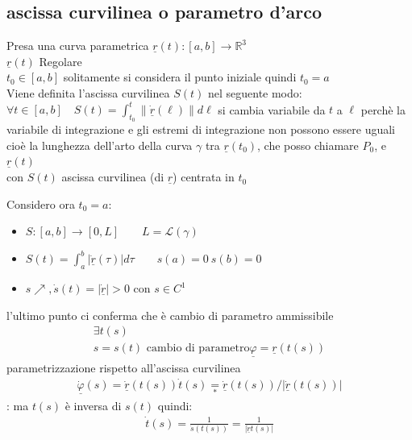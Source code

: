 \documentclass[a4paper, oneside]{article}
\begin{document}
\subsection{ascissa curvilinea o parametro d'arco}
\begin{definition}
    Presa una curva parametrica $\underline{r}(t):[a,b] \to \mathbb{R}^3$\\
     $\underline{r}(t)$ Regolare\\
     $t_0 \in [a,b]$ \tiny solitamente si considera il punto iniziale quindi $t_0 = a$\normalsize \\
    Viene definita l'ascissa curvilinea $S(t)$ nel seguente modo:\\ $\forall t \in [a,b] \quad S(t) = \int_{t_0}^{t}  \left\lVert \underline{\dot{r}}(\ell)\right\rVert  d\ell$ \tiny si cambia variabile da $t$ a $\ell$ perchè la variabile di integrazione e gli estremi di integrazione non possono essere uguali\normalsize\\
    cioè la lunghezza dell'arto della curva $\gamma$ tra $\underline{r}(t_0)$, che posso chiamare $P_0$, e $\underline{r}(t)$\\
    con $S(t)$ ascissa curvilinea (di $\underline{r}$) centrata in $t_0$ \\
    \end{definition}
    Considero ora $t_0 = a$:
    \begin{itemize}
        \item $S:[a,b] \to [0,L] \qquad L = \mathcal{L}(\gamma)$
        \item $S(t) = \int_{a}^{b} | \underline{\dot{r}} (\tau)| d\tau \qquad s(a) = 0 \ s(b) = 0$
        \item $s \nearrow , \dot{s}(t) = | \underline{\dot{r}} |> 0$ con $s \in C^1 $
    \end{itemize}
    l'ultimo punto ci conferma che è cambio di parametro ammissibile
\begin{gather*}
    \exists t(s)\\
    s= s(t) \text{ cambio di parametro}
    \boxed{\underline{\varphi} = \underline{r}(t(s))}
\end{gather*}
parametrizzazione rispetto all'ascissa curvilinea
\begin{gather*}
    \underline{\dot{\varphi}}(s) = \underline{\dot{r}}(t(s)) \dot{t}(s) \underset{\boxed{*}}{=} \underline{\dot{r}}(t(s)) / |\underline{\dot{r}}(t(s))|
\end{gather*}
\fbox{*}: ma $t(s)$ è inversa di $s(t)$ quindi:
\begin{gather*}
    \dot{t}(s) = \frac{1}{\dot{s}(t(s))} = \frac{1}{| \underline{\dot{r}} t(s) |}
\end{gather*}
\end{document}
